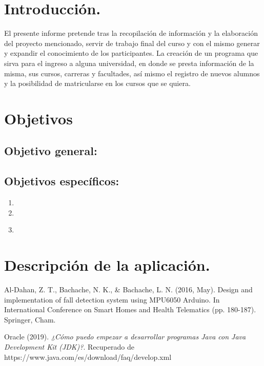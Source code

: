 \documentclass[12pt]{report}
\begin{document}

\pagebreak

\renewcommand{\thesection}{\arabic{section}}
\section*{Introducción.}
%
El presente informe pretende tras la recopilación de información y la elaboración del proyecto mencionado, servir de trabajo final del curso y con el mismo generar y expandir el conocimiento de los participantes. La creación de un programa que sirva para el ingreso a alguna universidad, en donde se presta información de la misma, sus cursos, carreras y facultades, así mismo el registro de nuevos alumnos y la posibilidad de matricularse en los cursos que se quiera.\\
 
\section*{Objetivos}

\subsection*{Objetivo general:}



\subsection*{Objetivos específicos:}

\begin{enumerate}
    \item 
    \item 
    \item \\

\end{enumerate}

\section*{Descripción de la aplicación.}
%


\begin{thebibliography}{111}
   
    Al-Dahan, Z. T., Bachache, N. K., & Bachache, L. N. (2016, May). Design and implementation of fall detection system using MPU6050 Arduino. In International Conference on Smart Homes and Health Telematics (pp. 180-187). Springer, Cham.

    Oracle (2019). {\it  ¿Cómo puedo empezar a desarrollar programas Java con Java Development Kit (JDK)?}. Recuperado de https://www.java.com/es/download/faq/develop.xml
    

    

\end{thebibliography}
\end{document}
